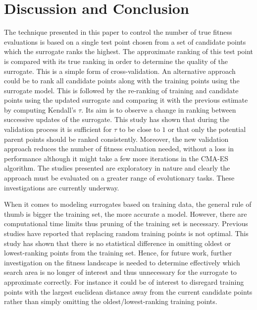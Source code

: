 \documentclass[conference]{IEEEtran}
\begin{document}
\section{Discussion and Conclusion}\label{sec:Discussion}
The technique presented in this paper to control the number of true fitness evaluations is based on a single test point chosen from a set of candidate points which the surrogate ranks the highest. The approximate ranking of this test point is compared with its true ranking in order to determine the quality of the surrogate. This is a simple form of cross-validation. An alternative approach could be to rank all candidate points along with the training points using the surrogate model. This is followed by the re-ranking of training and candidate points using the updated surrogate and comparing it with the previous estimate by computing Kendall's $\tau$. Its aim is to observe a change in ranking between successive updates of the surrogate. This study has shown that during the validation process it is sufficient for $\tau$ to be close to $1$ or that only the potential parent points should be ranked consistently. Moreover, the new validation approach reduces the number of fitness evaluation needed, without a loss in performance although it might take a few more iterations in the CMA-ES algorithm. The studies presented are exploratory in nature and clearly the approach must be evaluated on a greater range of evolutionary tasks. These investigations are currently underway. 

When it comes to modeling surrogates based on training data, the general rule of thumb is bigger the training set, the more accurate a model. However, there are computational time limits thus pruning of the training set is necessary. Previous studies \cite{Jin2005,Ratle1999} have reported that replacing random training points is not optimal. This study has shown that there is no statistical difference in omitting oldest or lowest-ranking points from the training set. Hence, for future work, further investigation on the fitness landscape is needed to determine effectively which search area is no longer of interest and thus unnecessary for the surrogate to approximate correctly. For instance it could be of interest to disregard training points with the largest euclidean distance away from the current candidate points rather than simply omitting the oldest/lowest-ranking training points. 
\end{document}
